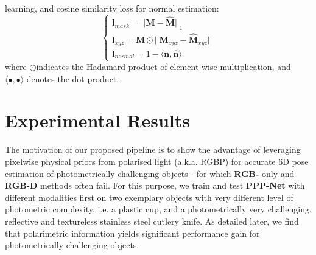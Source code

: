 \documentclass[10pt,twocolumn,letterpaper]{article}
\begin{document}
\nocite{*}
\author{Tamo steve}
\maketitle
learning, and cosine similarity loss for normal estimation:
\begin{equation}
\left\{
    \begin{array}{ll}
        \mathbf{l}_{mask}  = ||\mathbf{M} - \mathbf{\hat{M}}||_{1}\\
        \mathbf{l}_{xyz} = \mathbf{M} \odot ||\mathbf{M}_{xyz} - \mathbf{\hat{M}}_{xyz}||\\
        \mathbf{l}_{normal} = 1 - \langle\mathbf{n},\mathbf{\hat{n}}\rangle
    \end{array}
\right.
\end{equation}
where $\odot $indicates the Hadamard product of element-wise
multiplication, and $\langle\bullet,\bullet\rangle$ denotes the dot product.

\section{Experimental Results}
The motivation of our proposed pipeline is to show the
advantage of leveraging pixelwise physical priors from polarised light (a.k.a. RGBP) for accurate 6D pose estimation
of photometrically challenging objects - for which \textbf{RGB-} only and \textbf{RGB-D} methods often fail. For this purpose, we
train and test \textbf{PPP-Net} with different modalities first on two
exemplary objects with very different level of photometric
complexity, i.e. a plastic cup, and a photometrically very
challenging, reflective and textureless stainless steel cutlery
knife. As detailed later, we find that polarimetric information yields significant performance gain for photometrically
challenging objects.
\end{document}
